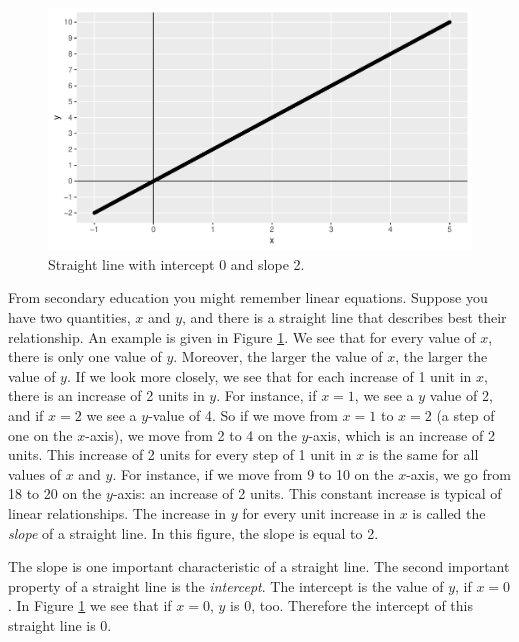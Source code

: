 \documentclass[]{report}\usepackage[]{graphicx}\usepackage[]{color}
\makeatletter
\def\maxwidth{ %
  \ifdim\Gin@nat@width>\linewidth
    \linewidth
  \else
    \Gin@nat@width
  \fi
}
\newenvironment{knitrout}{}{} %
\makeatother
\begin{document}
\begin{knitrout}
\color{fgcolor}\begin{figure}

{\centering \includegraphics[width=\maxwidth]{figure/lm_1-1} 

}

\caption[Straight line with intercept 0 and slope 2]{Straight line with intercept 0 and slope 2.}\label{fig:lm_1}
\end{figure}


\end{knitrout}


From secondary education you might remember linear equations. Suppose you have two quantities, $x$ and $y$, and there is a straight line that describes best their relationship. An example is given in Figure \ref{fig:lm_1}. We see that for every value of $x$, there is only one value of $y$. Moreover, the larger the value of $x$, the larger the value of $y$. If we look more closely, we see that for each increase of 1 unit in $x$, there is an increase of 2 units in $y$. For instance, if $x=1$, we see a $y$ value of 2, and if $x=2$ we see a $y$-value of 4. So if we move from $x=1$ to $x=2$ (a step of one on the $x$-axis), we move from 2 to 4 on the $y$-axis, which is an increase of 2 units. This increase of 2 units for every step of 1 unit in $x$ is the same for all values of $x$ and $y$. For instance, if we move from 9 to 10 on the $x$-axis, we go from 18 to 20 on the $y$-axis: an increase of 2 units. This constant increase is typical of linear relationships. The increase in $y$ for every unit increase in $x$ is called the \textit{slope} of a straight line. In this figure, the slope is equal to 2.

The slope is one important characteristic of a straight line. The second important property of a straight line is the \textit{intercept}. The intercept is the value of $y$, if $x=0$. In Figure \ref{fig:lm_1} we see that if $x=0$, $y$ is 0, too. Therefore the intercept of this straight line is 0.
\end{document}
